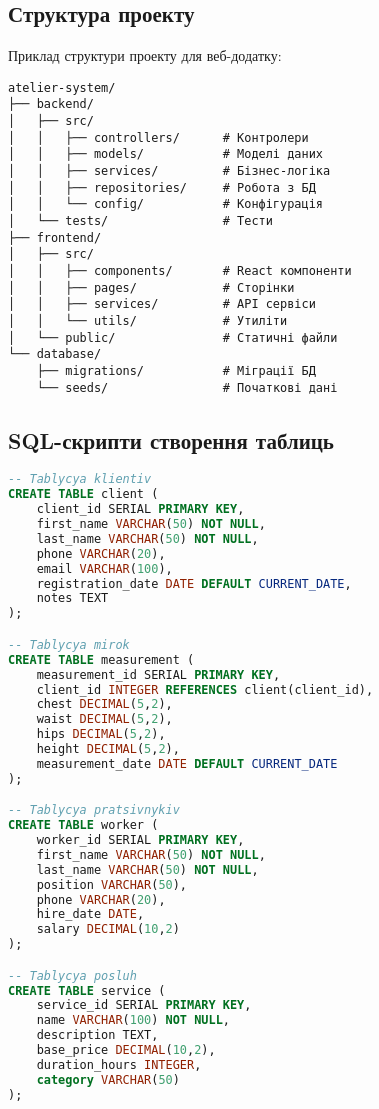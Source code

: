 \documentclass[14pt,a4paper]{extarticle}
\begin{document}
\subsection{Структура проекту}

Приклад структури проекту для веб-додатку:

\begin{verbatim}
atelier-system/
├── backend/
│   ├── src/
│   │   ├── controllers/      # Контролери
│   │   ├── models/           # Моделі даних
│   │   ├── services/         # Бізнес-логіка
│   │   ├── repositories/     # Робота з БД
│   │   └── config/           # Конфігурація
│   └── tests/                # Тести
├── frontend/
│   ├── src/
│   │   ├── components/       # React компоненти
│   │   ├── pages/            # Сторінки
│   │   ├── services/         # API сервіси
│   │   └── utils/            # Утиліти
│   └── public/               # Статичні файли
└── database/
    ├── migrations/           # Міграції БД
    └── seeds/                # Початкові дані
\end{verbatim}

\newpage
\subsection{SQL-скрипти створення таблиць}

\begin{lstlisting}[language=SQL, caption=Створення таблиць бази даних, basicstyle=\small\ttfamily, breaklines=true, frame=single]
-- Tablycya klientiv
CREATE TABLE client (
    client_id SERIAL PRIMARY KEY,
    first_name VARCHAR(50) NOT NULL,
    last_name VARCHAR(50) NOT NULL,
    phone VARCHAR(20),
    email VARCHAR(100),
    registration_date DATE DEFAULT CURRENT_DATE,
    notes TEXT
);

-- Tablycya mirok
CREATE TABLE measurement (
    measurement_id SERIAL PRIMARY KEY,
    client_id INTEGER REFERENCES client(client_id),
    chest DECIMAL(5,2),
    waist DECIMAL(5,2),
    hips DECIMAL(5,2),
    height DECIMAL(5,2),
    measurement_date DATE DEFAULT CURRENT_DATE
);

-- Tablycya pratsivnykiv
CREATE TABLE worker (
    worker_id SERIAL PRIMARY KEY,
    first_name VARCHAR(50) NOT NULL,
    last_name VARCHAR(50) NOT NULL,
    position VARCHAR(50),
    phone VARCHAR(20),
    hire_date DATE,
    salary DECIMAL(10,2)
);

-- Tablycya posluh
CREATE TABLE service (
    service_id SERIAL PRIMARY KEY,
    name VARCHAR(100) NOT NULL,
    description TEXT,
    base_price DECIMAL(10,2),
    duration_hours INTEGER,
    category VARCHAR(50)
);
\end{lstlisting}
\end{document}

